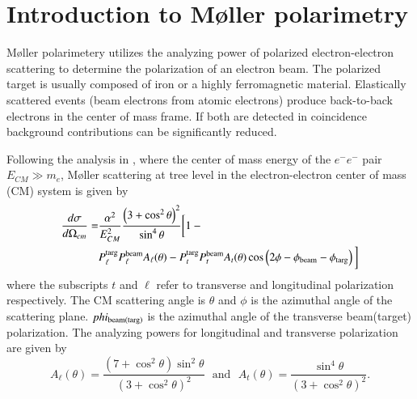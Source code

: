 \documentclass[preprint,12pt]{elsarticle}
\begin{document}
\section{Introduction to M\o ller polarimetry}
M\o ller polarimetery utilizes the analyzing power of polarized electron-electron scattering to determine the polarization of an electron beam. The polarized target is usually composed of iron or a highly ferromagnetic material. Elastically scattered events (beam electrons from atomic electrons) produce back-to-back electrons in the center of mass frame. If both are detected in coincidence background contributions can be significantly reduced.

Following the analysis in \cite{Swartz1995}, where the center of mass energy of the $e^-e^-$ pair $E_{CM}\gg m_e$, M\o ller scattering at tree level in the electron-electron center of mass (CM) system is given by
\begin{align}
\frac{d\sigma}{d\Omega_{cm}}=&\frac{\alpha^2}{E_{CM}^2}\frac{\left(3+\cos^2\theta\right)^2}{\sin^4\theta}\bigg[1- \bigg. \nonumber \\
&\bigg. P^{\rm targ}_{\ell}P^{\rm beam}_{\ell}A_{\ell}(\theta)-P^{\rm targ}_tP^{\rm beam}_tA_t(\theta)\cos\left(2\phi-\phi_{\rm beam}-\phi_{\rm targ}\right)\bigg]
\label{eq:moller_cx}
\end{align}
where the subscripts $t$ and $\ell$ refer to transverse and longitudinal polarization respectively. The CM scattering angle is $\theta$ and $\phi$ is the azimuthal angle of the scattering plane. $phi_{\rm beam(targ)} $ is the azimuthal angle of the transverse beam(target) polarization. The analyzing powers for longitudinal and transverse polarization are given by
\begin{equation}
A_{\ell}(\theta)=\frac{\left(7+\cos^2\theta\right)\sin^2\theta}{\left(3+\cos^2\theta\right)^2}~~~\textrm{and}~~~A_t(\theta)=\frac{\sin^4\theta}{\left(3+\cos^2\theta\right)^2}.
\label{eq:analyzing_pow}
\end{equation}
\end{document}
